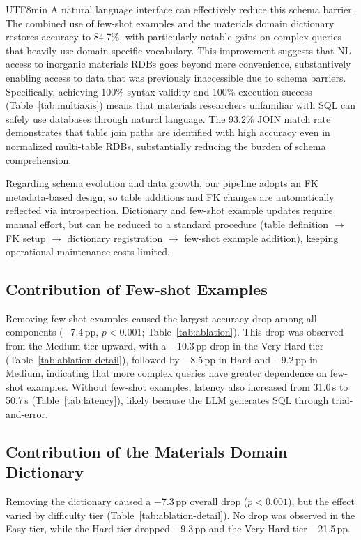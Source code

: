 \documentclass[sn-mathphys,Numbered]{sn-jnl}
\begin{document}
\begin{CJK}{UTF8}{min}
A natural language interface can effectively reduce this schema
barrier.
The combined use of few-shot examples and the materials domain
dictionary restores accuracy to 84.7\%, with particularly
notable gains on complex queries that heavily use
domain-specific vocabulary.
This improvement suggests that NL access to inorganic materials
RDBs goes beyond mere convenience, substantively enabling access
to data that was previously inaccessible due to schema barriers.
Specifically, achieving 100\% syntax validity and 100\% execution
success (Table~\ref{tab:multiaxis}) means that materials
researchers unfamiliar with SQL can safely use databases through
natural language.
The 93.2\% JOIN match rate demonstrates that table join paths are
identified with high accuracy even in normalized multi-table RDBs,
substantially reducing the burden of schema comprehension.

Regarding schema evolution and data growth, our pipeline adopts
an FK metadata-based design, so table additions and FK changes
are automatically reflected via introspection.
Dictionary and few-shot example updates require manual effort,
but can be reduced to a standard procedure
(table definition $\to$ FK setup $\to$ dictionary registration
$\to$ few-shot example addition), keeping operational maintenance
costs limited.

\subsection{Contribution of Few-shot Examples}

Removing few-shot examples caused the largest accuracy drop
among all components ($-$7.4\,pp, $p<0.001$;
Table~\ref{tab:ablation}).
This drop was observed from the Medium tier upward, with a
$-$10.3\,pp drop in the Very Hard tier
(Table~\ref{tab:ablation-detail}), followed by $-$8.5\,pp in
Hard and $-$9.2\,pp in Medium, indicating that more complex
queries have greater dependence on few-shot examples.
Without few-shot examples, latency also increased from 31.0\,s
to 50.7\,s (Table~\ref{tab:latency}), likely because the LLM
generates SQL through trial-and-error.

\subsection{Contribution of the Materials Domain Dictionary}

Removing the dictionary caused a $-$7.3\,pp overall drop
($p<0.001$), but the effect varied by difficulty tier
(Table~\ref{tab:ablation-detail}).
No drop was observed in the Easy tier, while the Hard tier
dropped $-$9.3\,pp and the Very Hard tier $-$21.5\,pp.


\end{CJK}
\end{document}

